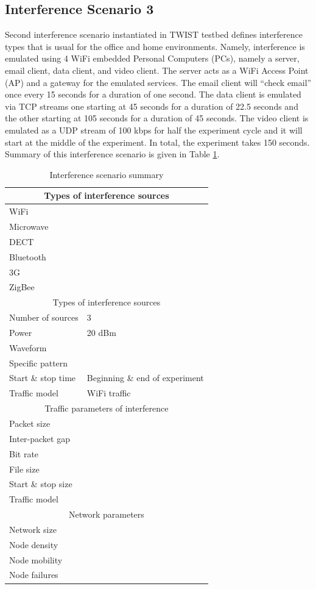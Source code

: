\documentclass[11pt,a4paper,headinclude,footinclude,chapterprefix=on]{scrreprt}
\begin{document}
\subsection{Interference Scenario 3}Second interference scenario instantiated in TWIST testbed defines interference types that is usual for the office and home environments. Namely, interference is emulated using 4 WiFi embedded Personal Computers (PCs), namely a server, email client, data client, and video client. The server acts as a WiFi Access Point (AP) and a gateway for the emulated services. The email client will “check email” once every 15 seconds for a duration of one second. The data client is emulated via TCP streams one starting at 45 seconds for a duration of 22.5 seconds and the other starting at 105 seconds for a duration of 45 seconds. The video client is emulated as a UDP stream of 100 kbps for half the experiment cycle and it will start at the middle of the experiment. In total, the experiment takes 150 seconds. Summary of this interference scenario is given in Table \ref{tb:interf:3}.
\begin{table}
	[h] \centering \caption{Interference scenario summary} \label{tb:interf:3}
	\begin{tabular}
		{|l|l|} \hline \multicolumn{2}{|c|}{Types of interference sources} \\
		\hline WiFi & \checkmark \\
		Microwave & \texttimes \\
		DECT & \texttimes \\
		Bluetooth & \texttimes \\
		3G & \texttimes \\
		ZigBee & \texttimes \\
		\hline \multicolumn{2}{|c|}{Types of interference sources} \\
		\hline Number of sources & 3 \\
		Power & 20 dBm \\
		Waveform & \\
		Specific pattern & \\
		Start \& stop time & Beginning \& end of experiment \\
		Traffic model & WiFi traffic \\
		\hline \multicolumn{2}{|c|}{Traffic parameters of interference} \\
		\hline Packet size & \\
		Inter-packet gap & \\
		Bit rate & \\
		File size & \\
		Start \& stop size & \\
		Traffic model & \\
		\hline \multicolumn{2}{|c|}{Network parameters} \\
		\hline Network size & \\
		Node density & \\
		Node mobility & \\
		Node failures & \\
		\hline 
	\end{tabular}
\end{table}
\end{document}
